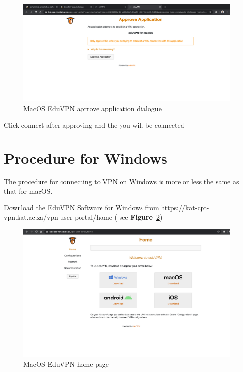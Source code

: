 \begin{figure}[H]
	\centering
	\includegraphics[scale=0.3]{Chapters/images/image26.png}
	
	\caption{MacOS EduVPN aprrove application dialogue }
	\label{fig:image26}
\end{figure}

Click connect after approving and the you will be connected

\section{Procedure for Windows}
The procedure for connecting to VPN on Windows is more or less the same as that for macOS. 

Download the EduVPN Software for Windows from https://kat-cpt-vpn.kat.ac.za/vpn-user-portal/home ( see \textbf{Figure}~\ref{fig:imag106})
\begin{figure}[H]
	\centering
	\includegraphics[scale=0.18]{Chapters/images/image106.png}
	
	\caption{MacOS EduVPN home page}
	\label{fig:imag106}
\end{figure}

